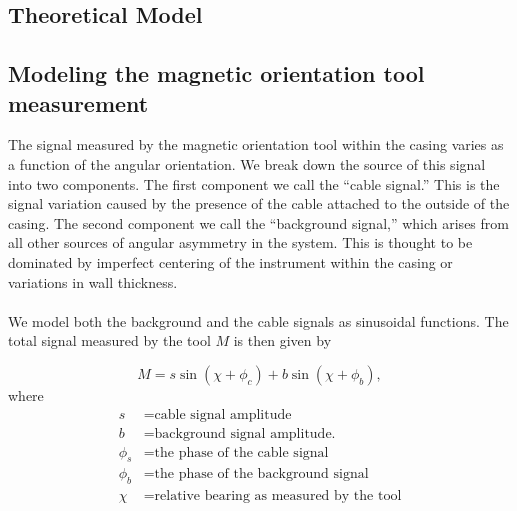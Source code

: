 \documentclass[paper=a4, fontsize=11pt]{scrartcl}
\numberwithin{equation}{section}		%
\numberwithin{figure}{section}			%
\numberwithin{table}{section}				%
\begin{document}
\begin{appendices}

\section{Theoretical Model}
\subsection{Modeling the magnetic orientation tool measurement}
The signal measured by the magnetic orientation tool within the casing varies as a function of the angular orientation.  We  break down the source of this signal into two components.  The first component we call the ``cable signal.''  This is the signal variation caused by the presence of the cable attached to the outside of the casing.  The second component we call the ``background signal,'' which arises from all other sources of angular asymmetry in the system.  This is thought to be dominated by imperfect centering of the instrument within the casing or variations in wall thickness.

\paragraph{} 
We model both the background and the cable signals as sinusoidal functions. The total signal measured by the tool $M$ is then given by

\begin{equation} \label{eq:trig_sig}
    M = s \sin\left(\chi + \phi_c\right) + b \sin\left(\chi + \phi_b\right),
\end{equation}
where
\begin{align*}
        s &= \text{cable signal amplitude} \\
        b &= \text{background signal amplitude.} \\
        \phi_s &= \text{the phase of the cable signal}\\
        \phi_b &= \text{the phase of the background signal}\\
        \chi &= \text{relative bearing as measured by the tool}\\
\end{align*}


\end{appendices}
\end{document}
